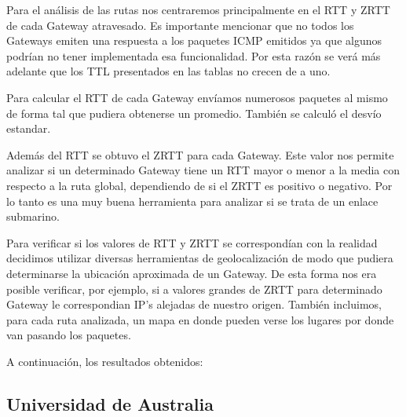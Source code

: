 
Para el análisis de las rutas nos centraremos principalmente en el RTT y ZRTT de cada Gateway atravesado. Es importante mencionar que no todos los Gateways emiten una respuesta a los paquetes ICMP emitidos ya que algunos podrían no tener implementada esa funcionalidad. Por esta razón se verá más adelante que los TTL presentados en las tablas no crecen de a uno.

Para calcular el RTT de cada Gateway envíamos numerosos paquetes al mismo de forma tal que pudiera obtenerse un promedio. También se calculó el desvío estandar.

Además del RTT se obtuvo el ZRTT para cada Gateway. Este valor nos permite analizar si un determinado Gateway tiene un RTT mayor o menor a la media con respecto a la ruta global, dependiendo de si el ZRTT es positivo o negativo. Por lo tanto es una muy buena herramienta para analizar si se trata de un enlace submarino.

Para verificar si los valores de RTT y ZRTT se correspondían con la realidad decidimos utilizar diversas herramientas de geolocalización de modo que pudiera determinarse la ubicación aproximada de un Gateway. De esta forma nos era posible verificar, por ejemplo, si a valores grandes de ZRTT para determinado Gateway le correspondian IP's alejadas de nuestro origen. También incluimos, para cada ruta analizada, un mapa en donde pueden verse los lugares por donde van pasando los paquetes.

A continuación, los resultados obtenidos:

\subsection{Universidad de Australia}

